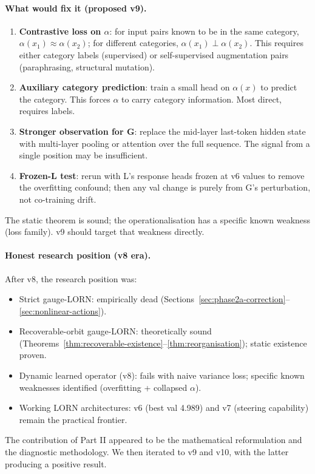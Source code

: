 \documentclass[11pt, a4paper]{article}
\theoremstyle{plain}
\theoremstyle{definition}
\theoremstyle{remark}
\begin{document}
\paragraph{What would fix it (proposed v9).}

\begin{enumerate}[nosep]
\item \textbf{Contrastive loss on $\alpha$}: for input pairs known to be in the same category, $\alpha(x_1) \approx \alpha(x_2)$; for different categories, $\alpha(x_1) \perp \alpha(x_2)$. This requires either category labels (supervised) or self-supervised augmentation pairs (paraphrasing, structural mutation).
\item \textbf{Auxiliary category prediction}: train a small head on $\alpha(x)$ to predict the category. This forces $\alpha$ to carry category information. Most direct, requires labels.
\item \textbf{Stronger observation for G}: replace the mid-layer last-token hidden state with multi-layer pooling or attention over the full sequence. The signal from a single position may be insufficient.
\item \textbf{Frozen-L test}: rerun with L's response heads frozen at v6 values to remove the overfitting confound; then any val change is purely from G's perturbation, not co-training drift.
\end{enumerate}

The static theorem is sound; the operationalisation has a specific known weakness (loss family). v9 should target that weakness directly.

\paragraph{Honest research position (v8 era).}

After v8, the research position was:
\begin{itemize}[nosep]
\item Strict gauge-LORN: empirically dead (Sections~\ref{sec:phase2a-correction}--\ref{sec:nonlinear-actions}).
\item Recoverable-orbit gauge-LORN: theoretically sound (Theorems~\ref{thm:recoverable-existence}--\ref{thm:reorganisation}); static existence proven.
\item Dynamic learned operator (v8): fails with naive variance loss; specific known weaknesses identified (overfitting + collapsed $\alpha$).
\item Working LORN architectures: v6 (best val 4.989) and v7 (steering capability) remain the practical frontier.
\end{itemize}
The contribution of Part II appeared to be the mathematical reformulation and the diagnostic methodology.
We then iterated to v9 and v10, with the latter producing a positive result.
\end{document}
